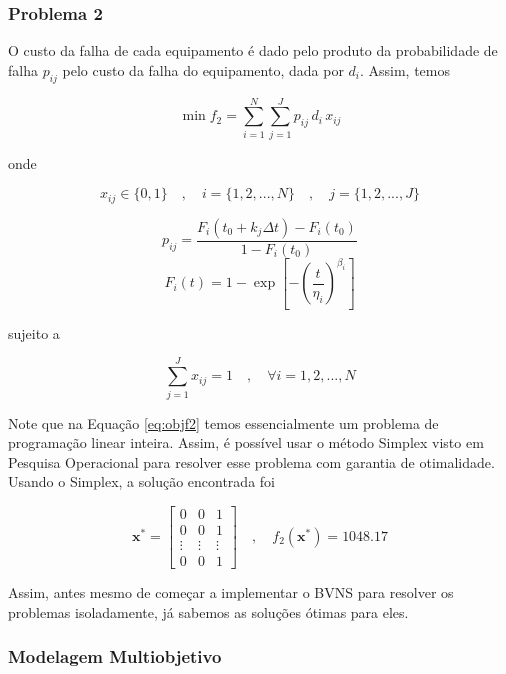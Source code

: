 \documentclass[conference]{IEEEtran}
\begin{document}
\subsubsection{Problema 2}

O custo da falha de cada equipamento é dado pelo produto da probabilidade de falha $p_{ij}$ pelo custo da falha do equipamento,
dada por $d_i$. Assim, temos 

\begin{equation}\label{eq:objf2}
	\min f_2 = \sum_{i=1}^{N} \sum_{j=1}^{J} p_{ij} \, d_i \, x_{ij}
\end{equation}

\noindent onde 

\[ x_{ij} \in \{0,1\} \quad , \quad i = \{1, 2, ..., N\}  \quad , \quad j = \{1, 2, ..., J\} \]


\begin{equation}\label{eq:pij}
	p_{ij} = \frac{F_i \left(t_0 + k_j \Delta t \right) - F_i\left(t_0\right) }{1 - F_i\left(t_0\right)}
\end{equation}
\begin{equation}\label{eq:fit}
	F_i(t) = 1 - \exp \left[ - \left( \frac{t}{\eta_i} \right)^{\beta_i} \right]
\end{equation}


\noindent sujeito a 

\begin{equation}\label{eq:restf2}
	\sum_{j=1}^{J} x_{ij} = 1 \quad , \quad \forall i = {1, 2, ..., N}
\end{equation}

Note que na Equação \ref{eq:objf2} temos essencialmente um problema de programação linear inteira.
Assim, é possível usar o método Simplex visto em Pesquisa Operacional para resolver esse problema
com garantia de otimalidade. Usando o Simplex, a solução encontrada foi 

\[ \mathbf{x^{*}}  = \begin{bmatrix} 
	0 & 0 & 1 \\
	0 & 0 & 1 \\
	\vdots & \vdots & \vdots \\
	0 &  0      & 1 
	\end{bmatrix} \quad , \quad f_2\left(\mathbf{x^{*}}\right) = 1048.17  \]

Assim, antes mesmo de começar a implementar o BVNS para resolver os problemas isoladamente, 
já sabemos as soluções ótimas para eles.

\subsubsection{Modelagem Multiobjetivo}
\end{document}
